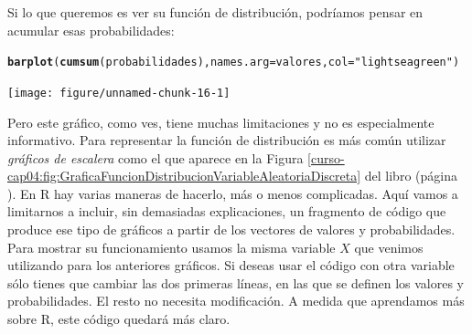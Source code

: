 \documentclass[10pt,a4paper]{article}\usepackage[]{graphicx}\usepackage[]{color}
\makeatletter
\newcommand{\hlstr}[1]{\textcolor[rgb]{0.192,0.494,0.8}{#1}}%
\newcommand{\hlstd}[1]{\textcolor[rgb]{0.345,0.345,0.345}{#1}}%
\newcommand{\hlkwc}[1]{\textcolor[rgb]{0.333,0.667,0.333}{#1}}%
\newcommand{\hlkwd}[1]{\textcolor[rgb]{0.737,0.353,0.396}{\textbf{#1}}}%
\newenvironment{kframe}{%
 \def\at@end@of@kframe{}%
 \ifinner\ifhmode%
  \def\at@end@of@kframe{\end{minipage}}%
  \begin{minipage}{\columnwidth}%
 \fi\fi%
 \def\FrameCommand##1{\hskip\@totalleftmargin \hskip-\fboxsep
 \colorbox{shadecolor}{##1}\hskip-\fboxsep
     \hskip-\linewidth \hskip-\@totalleftmargin \hskip\columnwidth}%
 \MakeFramed {\advance\hsize-\width
   \@totalleftmargin\z@ \linewidth\hsize
   \@setminipage}}%
 {\par\unskip\endMakeFramed%
 \at@end@of@kframe}
\newenvironment{knitrout}{}{} %
\makeatother
\begin{document}
Si lo que queremos es ver su función de distribución, podríamos pensar en acumular esas probabilidades:
\begin{knitrout}
\color{fgcolor}\begin{kframe}
\begin{alltt}
\hlkwd{barplot}\hlstd{(}\hlkwd{cumsum}\hlstd{(probabilidades),} \hlkwc{names.arg}\hlstd{=valores,} \hlkwc{col}\hlstd{=}\hlstr{"lightseagreen"}\hlstd{)}
\end{alltt}
\end{kframe}
\texttt{[image: figure/unnamed-chunk-16-1]} 

\end{knitrout}
Pero este gráfico, como ves,  tiene muchas limitaciones y no es especialmente informativo. Para representar la función de distribución es más común utilizar {\em gráficos de escalera} como el que aparece en la Figura \ref{curso-cap04:fig:GraficaFuncionDistribucionVariableAleatoriaDiscreta} del libro (página \pageref{curso-cap04:fig:GraficaFuncionDistribucionVariableAleatoriaDiscreta}). En R hay varias maneras de hacerlo, más o menos complicadas. Aquí vamos a limitarnos a incluir, sin demasiadas explicaciones, un fragmento de código que produce ese tipo de gráficos a partir de los vectores de valores y probabilidades. Para mostrar su funcionamiento usamos la misma variable $X$ que venimos utilizando para los anteriores gráficos. Si deseas usar el código con otra variable sólo tienes que cambiar las dos primeras líneas, en las que se definen los valores y probabilidades. El resto no necesita modificación. A medida que aprendamos más sobre R, este código quedará más claro.
\end{document}
